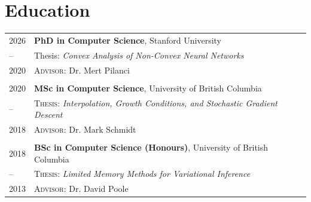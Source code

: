 \documentclass[10pt]{article}
\begin{document}
\section{Education}
\begin{longtable}
    {R{1.8cm}|p{11cm}}
    \textsc{2026}         & \textbf{PhD in Computer Science}, Stanford University          \\
    { -- \hspace{0.2cm} } & Thesis: \textit{Convex Analysis of Non-Convex Neural Networks} \\
    \textsc{2020}         & \textsc{Advisor:}
    Dr.
    Mert Pilanci                                                                           \\  \\ \textsc{2020} & \textbf{MSc in
                                                                                                                                          Computer Science}, University of British Columbia                                      \\ { -- \hspace{0.2cm} } &
    \textsc{Thesis}: \textit{Interpolation, Growth Conditions, and Stochastic
                         Gradient Descent}               \\ \textsc{2018} & \textsc{Advisor:} Dr.
    Mark Schmidt                                                                           \\  \\ \textsc{2018} & \textbf{BSc in
                                                                                                                                          Computer Science (Honours)}, University of British Columbia                            \\ { --
                                                                                                                                                                                                                                        \hspace{0.2cm} }      & \textsc{Thesis:} \textit{Limited Memory Methods for
                                                                                                                                                                                                                                                                                     Variational Inference}                                                                 \\ \textsc{2013} & \textsc{Advisor:} Dr.
    David Poole
\end{longtable}
\end{document}
